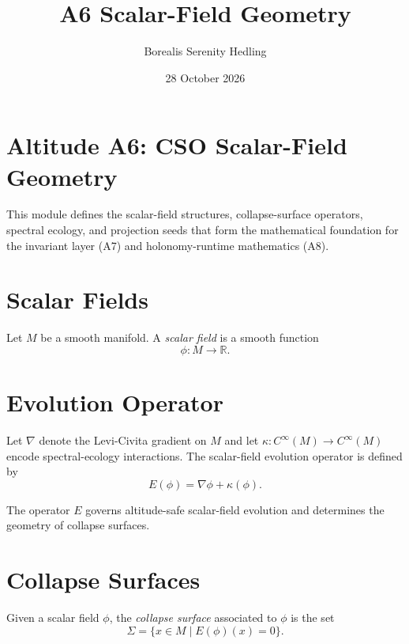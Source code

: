 \documentclass[12pt]{article}
\title{A6 Scalar-Field Geometry}
\author{Borealis Serenity Hedling}
\date{28 October 2026}
\begin{document}
\maketitle

\section*{Altitude A6: CSO Scalar-Field Geometry}

This module defines the scalar-field structures, collapse-surface operators,
spectral ecology, and projection seeds that form the mathematical foundation
for the invariant layer (A7) and holonomy-runtime mathematics (A8).

\section{Scalar Fields}

\begin{definition}
Let $M$ be a smooth manifold. A \emph{scalar field} is a smooth function
\[
\phi : M \to \mathbb{R}.
\]
\end{definition}

\section{Evolution Operator}

\begin{definition}
Let $\nabla$ denote the Levi-Civita gradient on $M$ and let
$\kappa : C^\infty(M) \to C^\infty(M)$ encode spectral-ecology interactions.
The scalar-field evolution operator is defined by
\[
E(\phi) = \nabla \phi + \kappa(\phi).
\]
\end{definition}

\begin{remark}
The operator $E$ governs altitude-safe scalar-field evolution and determines
the geometry of collapse surfaces.
\end{remark}

\section{Collapse Surfaces}

\begin{definition}
Given a scalar field $\phi$, the \emph{collapse surface} associated to $\phi$
is the set
\[
\Sigma = \{ x \in M \mid E(\phi)(x) = 0 \}.
\]
\end{definition}
\end{document}
